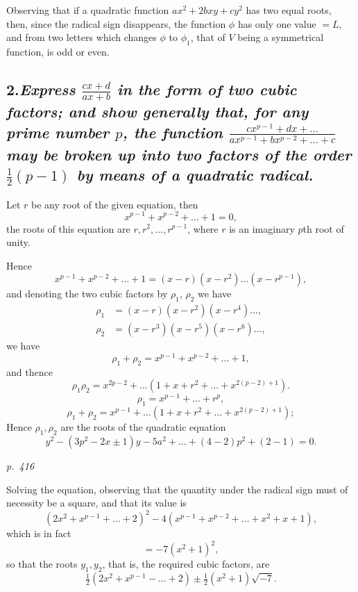 \documentclass[11pt,a4paper]{book}
\begin{document}
Observing that if a quadratic function $a x^2 + 2 b x y + c y^2$ has two equal roots, then,
since the radical sign disappears, the function $\phi$ has only one value $= L$, and from
two letters which changes $\phi$ to $\phi_1$, that of $V$ being a symmetrical function,
is odd or even.

\subsection*{2.\quad \textit{Express $\frac{c x + d}{a x + b}$ in the form of two cubic factors; and show generally that, for any prime number $p$, the function $\frac{c x^{p-1} + d x + \ldots}{a x^{p-1} + b x^{p-2} + \ldots + c}$ may be broken up into two factors of the order $\frac{1}{2}(p-1)$ by means of a quadratic radical.}}

Let $r$ be any root of the given equation, then
\[
x^{p-1} + x^{p-2} + \ldots + 1 = 0,
\]
the roots of this equation are $r, r^2, \ldots, r^{p-1}$, where $r$ is an imaginary $p$th root of unity.

Hence
\[
x^{p-1} + x^{p-2} + \ldots + 1 = (x - r)(x - r^2) \ldots (x - r^{p-1}),
\]
and denoting the two cubic factors by $\rho_1$, $\rho_2$ we have
\begin{align*}
\rho_1 &= (x - r)(x - r^2)(x - r^4)\ldots, \\
\rho_2 &= (x - r^3)(x - r^5)(x - r^6)\ldots,
\end{align*}
we have
\[
\rho_1 + \rho_2 = x^{p-1} + x^{p-2} + \ldots + 1,
\]
and thence
\[
\rho_1 \rho_2 = x^{2p-2} + \ldots(1+x+r^2+\ldots+x^{2(p-2)+1}).
\]
\[
\rho_1 = x^{p-1} + \ldots + r^p,
\]
\[
\rho_1 + \rho_2 = x^{p-1} + \ldots(1+x+r^2+\ldots+x^{2(p-2)+1});
\]
Hence $\rho_1, \rho_2$ are the roots of the quadratic equation
\[
y^2 - (3 p^2 - 2 x \pm 1) y - 5 a^2 + \ldots + (4 - 2) p^2 + (2 - 1) = 0.
\]

\clearpage

\bigskip
\textit{p.~416}
\smallskip

\noindent
Solving the equation, observing that the quantity under the radical sign must of
necessity be a square, and that its value is
\[
(2 x^2 + x^{p-1} + \ldots + 2)^2 - 4 (x^{p-1} + x^{p-2} + \ldots + x^2 + x + 1),
\]
which is in fact
\[
= -7 (x^2 + 1)^2,
\]
so that the roots $y_1, y_2$, that is, the required cubic factors, are
\[
\tfrac{1}{2} (2 x^2 + x^{p-1} - \ldots + 2) \pm \tfrac{1}{2} (x^2 + 1) \sqrt{-7}.
\]
\end{document}
